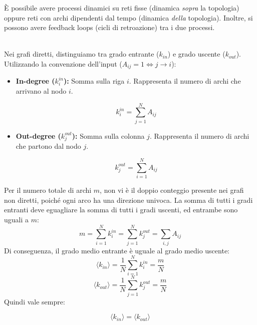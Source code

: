 È possibile avere processi dinamici su reti fisse (dinamica \textit{sopra} la topologia) oppure reti con archi dipendenti dal tempo (dinamica \textit{della} topologia). Inoltre, si possono avere feedback loops (cicli di retroazione) tra i due processi.

\hfill \\

\noindent Nei grafi diretti, distinguiamo tra grado entrante ($k_{in}$) e grado uscente ($k_{out}$). Utilizzando la convenzione dell'input ($A_{ij}=1 \iff j \to i$):

\begin{itemize}
    \item \textbf{In-degree ($k_i^{in}$):} Somma sulla riga $i$. Rappresenta il numero di archi che arrivano al nodo $i$.
    \begin{tcolorbox}[colback=yellow!25, colframe=yellow!75!orange, coltitle=black, title=\textbf{Grado Entrante}]
    \begin{equation}
    k_i^{in} = \sum_{j=1}^N A_{ij}
    \end{equation}
    \end{tcolorbox}
    
    
    
    \item \textbf{Out-degree ($k_j^{out}$):} Somma sulla colonna $j$. Rappresenta il numero di archi che partono dal nodo $j$.
     \begin{tcolorbox}[colback=yellow!25, colframe=yellow!75!orange, coltitle=black, title=\textbf{Grado Uscente}]
     \begin{equation}
    k_j^{out} = \sum_{i=1}^N A_{ij}
    \end{equation}
    \end{tcolorbox}
\end{itemize}
Per il numero totale di archi $m$, non vi è il doppio conteggio presente nei grafi non diretti, poiché ogni arco ha una direzione univoca. La somma di tutti i gradi entranti deve eguagliare la somma di tutti i gradi uscenti, ed entrambe sono uguali a $m$:
\begin{equation}
m = \sum_{i=1}^N k_i^{in} = \sum_{j=1}^N k_j^{out} = \sum_{i,j} A_{ij}
\end{equation}
Di conseguenza, il grado medio entrante è uguale al grado medio uscente:
\begin{equation}
\langle k_{in} \rangle = \frac{1}{N}\sum_{i=1}^N k_i^{in} = \frac{m}{N}
\end{equation}
\begin{equation}
\langle k_{out} \rangle = \frac{1}{N}\sum_{j=1}^N k_j^{out} = \frac{m}{N}
\end{equation}
Quindi vale sempre:
 \begin{tcolorbox}[colback=yellow!25, colframe=yellow!75!orange, coltitle=black, title=\textbf{Grado Medio}]
     \begin{equation}
    \langle k_{in} \rangle = \langle k_{out} \rangle
    \end{equation}
\end{tcolorbox}


